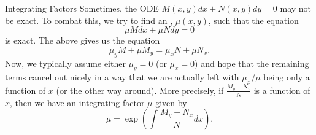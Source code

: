 \documentclass[dvipsnames]{beamer}
\theoremstyle{definition}
\begin{document}
\begin{frame}{Integrating Factors}
  Sometimes, the ODE $M(x, y) dx + N(x, y) dy = 0$ may not be exact. \pause To combat this, we try to find an , \pause $\mu(x, y)$, \pause such that the equation
  \begin{equation*} 
    \mu M dx + \mu N dy = 0
  \end{equation*}
  is exact. \pause The above gives us the equation
  \begin{equation*} 
    \mu_{y} M + \mu M_{y} = \mu_{x} N + \mu N_{x}.
  \end{equation*} \pause
  Now, we typically assume either $\mu_{y} = 0$ (or $\mu_{x} = 0$) and hope that the remaining terms cancel out nicely in a way that we are actually left with $\mu_{x}/\mu$ being only a function of $x$ (or the other way around). \pause More precisely, if $\frac{M_{y} - N_{x}}{N}$ is a function of $x$, \pause then we have an integrating factor $\mu$ given by
  \begin{equation*} 
    \mu = \exp\left(\int \frac{M_{y} - N_{x}}{N} dx\right).
  \end{equation*}
\end{frame}
\end{document}
